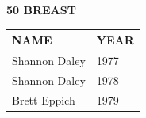 \begin{table}[H]
\centering
\begin{minipage}[t]{0.6\textwidth}
\centering
\textbf{50 BREAST}\\[0.1cm]
\begin{tabular}{@{}p{2.8cm}p{1.2cm}@{}}
\hline
    \textbf{NAME} & \textbf{YEAR} \\
\hline
    Shannon Daley & 1977 \\
    Shannon Daley & 1978 \\
    Brett Eppich & 1979 \\
\hline
\end{tabular}
\end{minipage}
\end{table}

